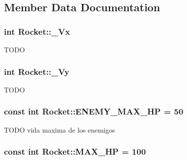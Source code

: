 \subsection{Member Data Documentation}
\hypertarget{class_rocket_af29030dcde63c0c11f394855eabeb035}{
\subsubsection[{\-\_\-\-Vx}]{\setlength{\rightskip}{0pt plus 5cm}int Rocket\-::\-\_\-\-Vx\hspace{0.3cm}{\ttfamily [protected]}}}\label{class_rocket_af29030dcde63c0c11f394855eabeb035}
T\-O\-D\-O \hypertarget{class_rocket_a8755419e9cbd841f0ca08e9203d5d51b}{
\subsubsection[{\-\_\-\-Vy}]{\setlength{\rightskip}{0pt plus 5cm}int Rocket\-::\-\_\-\-Vy\hspace{0.3cm}{\ttfamily [protected]}}}\label{class_rocket_a8755419e9cbd841f0ca08e9203d5d51b}
T\-O\-D\-O \hypertarget{class_rocket_adf93733f7bd7643acfb98d5e9feab7c5}{
\subsubsection[{E\-N\-E\-M\-Y\-\_\-\-M\-A\-X\-\_\-\-H\-P}]{\setlength{\rightskip}{0pt plus 5cm}const int Rocket\-::\-E\-N\-E\-M\-Y\-\_\-\-M\-A\-X\-\_\-\-H\-P = 50\hspace{0.3cm}{\ttfamily [static]}}}\label{class_rocket_adf93733f7bd7643acfb98d5e9feab7c5}
T\-O\-D\-O vida maxima de los enemigos \hypertarget{class_rocket_ad631a51a51c3dcbb927604c6b498498d}{
\subsubsection[{M\-A\-X\-\_\-\-H\-P}]{\setlength{\rightskip}{0pt plus 5cm}const int Rocket\-::\-M\-A\-X\-\_\-\-H\-P = 100\hspace{0.3cm}{\ttfamily [static]}}}\label{class_rocket_ad631a51a51c3dcbb927604c6b498498d}
